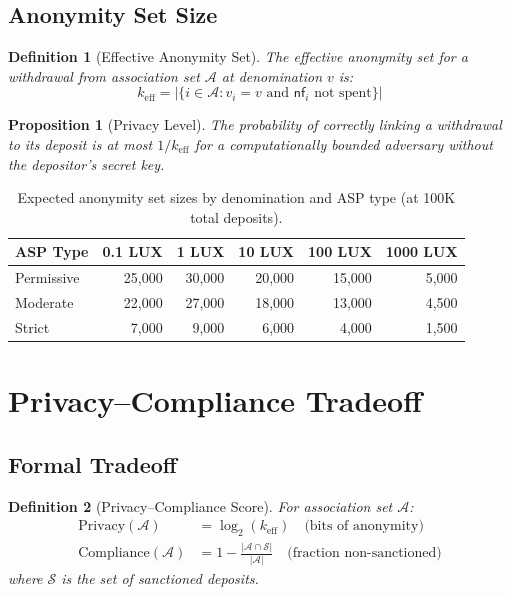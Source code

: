 \documentclass[11pt,a4paper]{article}
\newtheorem{proposition}[theorem]{Proposition}
\newtheorem{definition}{Definition}
\begin{document}
\subsection{Anonymity Set Size}

\begin{definition}[Effective Anonymity Set]
The effective anonymity set for a withdrawal from association set $\mathcal{A}$ at denomination $v$ is:
\begin{equation}
    k_{\text{eff}} = |\{i \in \mathcal{A} : v_i = v \text{ and } \mathsf{nf}_i \text{ not spent}\}|
\end{equation}
\end{definition}

\begin{proposition}[Privacy Level]
The probability of correctly linking a withdrawal to its deposit is at most $1/k_{\text{eff}}$ for a computationally bounded adversary without the depositor's secret key.
\end{proposition}

\begin{table}[H]
\centering
\caption{Expected anonymity set sizes by denomination and ASP type (at 100K total deposits).}
\label{tab:anonymity}
\begin{tabular}{lrrrrr}
\toprule
\textbf{ASP Type} & \textbf{0.1 LUX} & \textbf{1 LUX} & \textbf{10 LUX} & \textbf{100 LUX} & \textbf{1000 LUX} \\
\midrule
Permissive & 25,000 & 30,000 & 20,000 & 15,000 & 5,000 \\
Moderate & 22,000 & 27,000 & 18,000 & 13,000 & 4,500 \\
Strict & 7,000 & 9,000 & 6,000 & 4,000 & 1,500 \\
\bottomrule
\end{tabular}
\end{table}

\section{Privacy--Compliance Tradeoff}\label{sec:tradeoff}

\subsection{Formal Tradeoff}

\begin{definition}[Privacy--Compliance Score]
For association set $\mathcal{A}$:
\begin{align}
    \text{Privacy}(\mathcal{A}) &= \log_2(k_{\text{eff}}) \quad \text{(bits of anonymity)} \\
    \text{Compliance}(\mathcal{A}) &= 1 - \frac{|\mathcal{A} \cap \mathcal{S}|}{|\mathcal{A}|} \quad \text{(fraction non-sanctioned)}
\end{align}
where $\mathcal{S}$ is the set of sanctioned deposits.
\end{definition}
\end{document}
